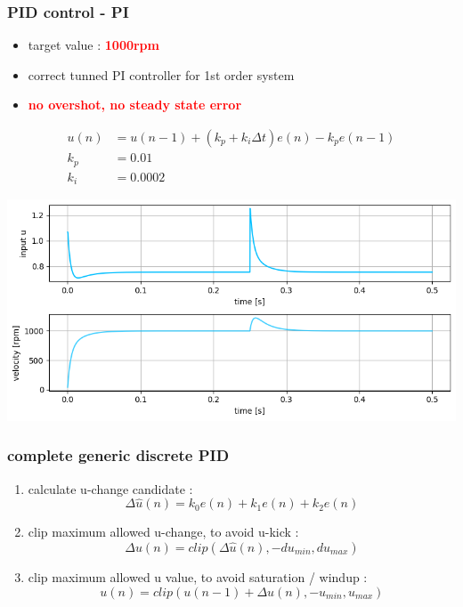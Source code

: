 \documentclass{beamer}
\begin{document}
\begin{frame}
  
  \frametitle{\textbf { PID control - PI}}

  \begin{itemize}
    \item  target value : \textcolor{red}{\textbf { 1000rpm}}
    \item  correct tunned PI controller for 1st order system
    \item  \textcolor{red}{\textbf { no overshot, no steady state error}}
  \end{itemize}

  \begin{align*}
    u(n) &= u(n-1) + (k_p + k_i\Delta t) e(n) - k_pe(n-1) \\
    k_p    &= 0.01 \\
    k_i    &= 0.0002
  \end{align*}

  {\centering \includegraphics[scale=0.4]{../images/motor_control/pid_pi_control_1.png}}

\end{frame}



\begin{frame}
  
  \frametitle{\textbf { complete generic discrete PID}}

  \begin{enumerate}
    \item  calculate u-change candidate :
      $$\Delta \hat{u}(n) = k_0e(n) + k_1e(n) + k_2e(n)$$
    
    \item clip maximum allowed u-change, to avoid u-kick :
      $$\Delta u(n) = clip(\Delta \hat{u}(n), -du_{min}, du_{max})$$

    \item clip maximum allowed u value, to avoid saturation / windup :
      $$u(n) = clip(u(n-1) + \Delta u(n), -u_{min}, u_{max})$$
  \end{enumerate}
  
\end{frame}
\end{document}

